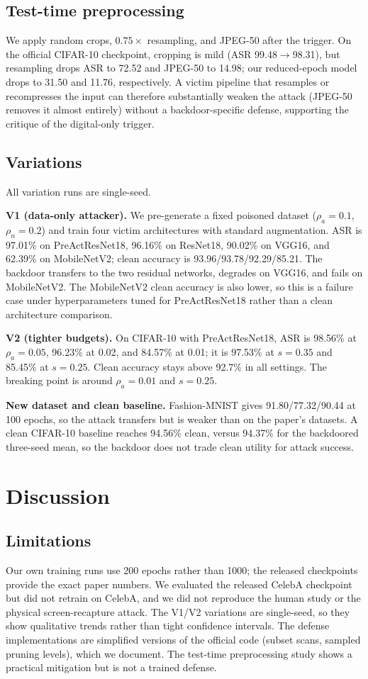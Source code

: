 \documentclass[conference]{IEEEtran}
\begin{document}
\subsection{Test-time preprocessing}
We apply random crops, $0.75\times$ resampling, and JPEG-50 after the trigger.
On the official CIFAR-10 checkpoint, cropping is mild (ASR 99.48$\to$98.31),
but resampling drops ASR to 72.52 and JPEG-50 to 14.98; our reduced-epoch
model drops to 31.50 and 11.76, respectively. A victim pipeline that resamples
or recompresses the input can therefore substantially weaken the attack
(JPEG-50 removes it almost entirely) without a backdoor-specific defense,
supporting the critique of the digital-only trigger.

\subsection{Variations}
All variation runs are single-seed.

\textbf{V1 (data-only attacker).} We pre-generate a fixed poisoned dataset
($\rho_a=0.1$, $\rho_n=0.2$) and train four victim architectures with standard
augmentation. ASR is 97.01\% on PreActResNet18, 96.16\% on ResNet18, 90.02\%
on VGG16, and 62.39\% on MobileNetV2; clean accuracy is
93.96/93.78/92.29/85.21. The backdoor transfers to the two residual networks,
degrades on VGG16, and fails on MobileNetV2. The MobileNetV2 clean accuracy is
also lower, so this is a failure case under hyperparameters tuned for
PreActResNet18 rather than a clean architecture comparison.

\textbf{V2 (tighter budgets).} On CIFAR-10 with PreActResNet18, ASR is 98.56\%
at $\rho_a=0.05$, 96.23\% at 0.02, and 84.57\% at 0.01; it is 97.53\% at
$s=0.35$ and 85.45\% at $s=0.25$. Clean accuracy stays above 92.7\% in all
settings. The breaking point is around $\rho_a=0.01$ and $s=0.25$.

\textbf{New dataset and clean baseline.} Fashion-MNIST gives
91.80/77.32/90.44 at 100 epochs, so the attack transfers but is weaker than on
the paper's datasets. A clean CIFAR-10 baseline reaches 94.56\% clean, versus
94.37\% for the backdoored three-seed mean, so the backdoor does not trade
clean utility for attack success.

\section{Discussion}
\subsection{Limitations}
Our own training runs use 200 epochs rather than 1000; the released
checkpoints provide the exact paper numbers. We evaluated the released CelebA
checkpoint but did not retrain on CelebA, and we did not reproduce the human
study or the physical screen-recapture attack. The V1/V2 variations are
single-seed, so they show qualitative trends rather than tight confidence
intervals. The defense implementations are simplified versions of the official
code (subset scans, sampled pruning levels), which we document. The test-time
preprocessing study shows a practical mitigation but is not a trained defense.
\end{document}
